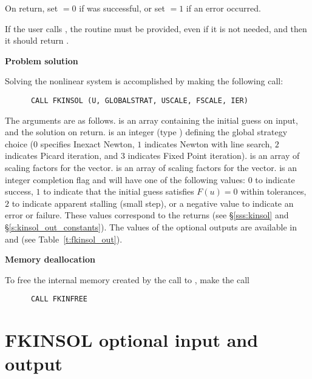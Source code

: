 \begin{Steps}
  On return, set  $= 0$ if  was successful, or set  $= 1$
  if an error occurred.
  
  {\warn} If the user calls , the routine  must
  be provided, even if it is not needed, and then it should return .

\item {\bf Problem solution}

  Solving the nonlinear system is accomplished by making the following call:
\begin{verbatim}
      CALL FKINSOL (U, GLOBALSTRAT, USCALE, FSCALE, IER)
\end{verbatim}
  The arguments are as follows.
   is an array containing the initial guess on input, and the
  solution on return.
   is an integer (type ) defining the global strategy 
  choice ($0$ specifies Inexact Newton, $1$ indicates Newton with line search,
  $2$ indicates Picard iteration, and $3$ indicates Fixed Point iteration).
   is an array of scaling factors for the  vector.
   is an array of scaling factors for the  vector.
   is an integer completion flag and will have one of the following values:
  $0$ to indicate success,
  $1$ to indicate that the initial guess satisfies $F(u) = 0$ within tolerances,
  $2$ to indicate apparent stalling (small step), or a negative value to indicate
  an error or failure. These values correspond to the  returns
  (see \S\ref{sss:kinsol} and \S\ref{s:kinsol_out_constants}). The values of
  the optional outputs are available in  and 
  (see Table~\ref{t:fkinsol_out}).

\item {\bf Memory deallocation}

  To free the internal memory created by the call to ,
  make the call
\begin{verbatim}
      CALL FKINFREE
\end{verbatim}

\end{Steps}


\section{FKINSOL optional input and output}\label{fkin_opt_inout}

